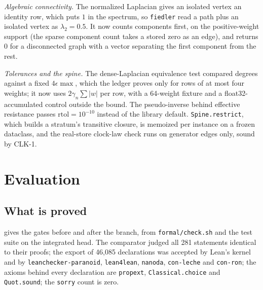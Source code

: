 \documentclass[11pt]{article}
\theoremstyle{plain}
\theoremstyle{definition}
\theoremstyle{remark}
\newcommand{\abs}[1]{\lvert #1 \rvert}
\begin{document}
\emph{Algebraic connectivity.} The normalized Laplacian gives an isolated vertex an identity row,
which puts $1$ in the spectrum, so \texttt{fiedler} read a path plus an isolated vertex as
$\lambda_2 = 0.5$. It now counts components first, on the positive-weight support (the sparse
component count takes a stored zero as an edge), and returns $0$ for a disconnected graph with a
vector separating the first component from the rest.

\emph{Tolerances and the spine.} The dense-Laplacian equivalence test compared degrees against a
fixed $4\epsilon\max$, which the ledger proves only for rows of at most four weights; it now uses
$2\gamma_n\sum\abs{w}$ per row, with a 64-weight fixture and a float32-accumulated control outside
the bound. The pseudo-inverse behind effective resistance passes $\mathrm{rtol} = 10^{-10}$
instead of the library default. \texttt{Spine.restrict}, which builds a stratum's transitive
closure, is memoized per instance on a frozen dataclass, and the real-store clock-law check runs
on generator edges only, sound by CLK-1.

\section{Evaluation}

\subsection{What is proved}

 gives the gates before and after the branch, from \texttt{formal/check.sh} and
the test suite on the integrated head. The comparator judged all 281 statements identical to
their proofs; the export of 46,085 declarations was accepted by Lean's kernel and by
\texttt{leanchecker-paranoid}, \texttt{lean4lean}, \texttt{nanoda}, \texttt{con-leche} and
\texttt{con-ron}; the axioms behind every declaration are \texttt{propext},
\texttt{Classical.choice} and \texttt{Quot.sound}; the \texttt{sorry} count is zero.
\end{document}
